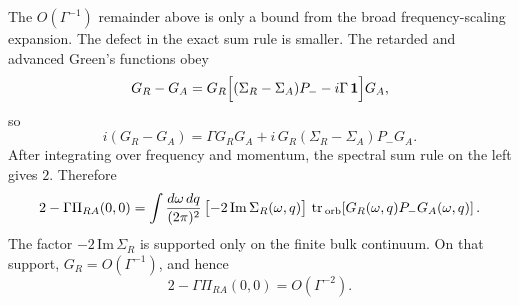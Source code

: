\documentclass[aps,prx,preprint,amsmath,amssymb]{revtex4-2}
\newcommand{\tr}{{\rm \, tr\,}}
\begin{document}
The \(O(\Gamma^{-1})\) remainder above is only a bound from the broad
frequency-scaling expansion.  The defect in the exact sum rule is smaller.  The
retarded and advanced Green's functions obey
\[
G_R-G_A
=
G_R\Bigl[(\Sigma_R-\Sigma_A)P_- - i\Gamma\,\mathbf{1}\Bigr]G_A,
\]
so
\[
i(G_R-G_A)
=
\Gamma G_RG_A
+i\,G_R(\Sigma_R-\Sigma_A)P_-G_A.
\]
After integrating over frequency and momentum, the spectral sum rule on the
left gives \(2\).  Therefore
\begin{equation}
\label{eq:pi00-mass-identity-app}
2-\Gamma\Pi_{RA}(0,0)
=
\int\frac{d\omega\,dq}{(2\pi)^2}\,
\bigl[-2\,\mathrm{Im}\,\Sigma_R(\omega,q)\bigr]\,
\tr_{\rm orb}\!\left[
G_R(\omega,q)P_-G_A(\omega,q)
\right].
\end{equation}
The factor \(-2\,\mathrm{Im}\,\Sigma_R\) is supported only on the finite bulk
continuum.  On that support, \(G_R=O(\Gamma^{-1})\), and hence
\begin{equation}
\label{eq:pi00-mass-scale-app}
2-\Gamma\Pi_{RA}(0,0)=O(\Gamma^{-2}).
\end{equation}
\end{document}
